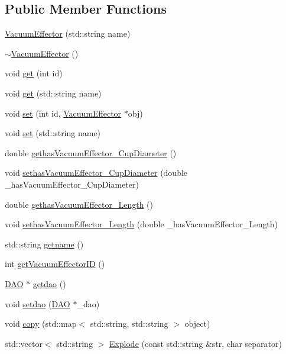 \subsection*{Public Member Functions}
\begin{DoxyCompactItemize}
\item 
\hyperlink{class_vacuum_effector_a624ed5711e9dc11a4bcdc0f6c6fd3879}{VacuumEffector} (std::string name)
\item 
\hyperlink{class_vacuum_effector_a26dc7aee2d9b3a9a7c19b5e06ac8d8f4}{$\sim$VacuumEffector} ()
\item 
void \hyperlink{class_vacuum_effector_ad61efa5e78bbcd8295b09c78488f013e}{get} (int id)
\item 
void \hyperlink{class_vacuum_effector_a7424e643d7c5440e7f988c2321b78c20}{get} (std::string name)
\item 
void \hyperlink{class_vacuum_effector_ae3c710ab5c7f24ef14b766205f3e43d8}{set} (int id, \hyperlink{class_vacuum_effector}{VacuumEffector} $\ast$obj)
\item 
void \hyperlink{class_vacuum_effector_aec767abec4cef2161bcb7e2ab7438bd2}{set} (std::string name)
\item 
double \hyperlink{class_vacuum_effector_a4c903eca9f47bb484b5059db9a9afebb}{gethasVacuumEffector\_\-CupDiameter} ()
\item 
void \hyperlink{class_vacuum_effector_a745ed7e7d447512fab5153513511d8cd}{sethasVacuumEffector\_\-CupDiameter} (double \_\-hasVacuumEffector\_\-CupDiameter)
\item 
double \hyperlink{class_vacuum_effector_ae4473fa9339b87b255972ebdba18b32e}{gethasVacuumEffector\_\-Length} ()
\item 
void \hyperlink{class_vacuum_effector_a27449af1c800a9719aecc32a17abb9a7}{sethasVacuumEffector\_\-Length} (double \_\-hasVacuumEffector\_\-Length)
\item 
std::string \hyperlink{class_vacuum_effector_a471a9f8cfa7431bda4f60b1c1c81aba2}{getname} ()
\item 
int \hyperlink{class_vacuum_effector_ae15296196f98577af7859b53792b97e0}{getVacuumEffectorID} ()
\item 
\hyperlink{class_d_a_o}{DAO} $\ast$ \hyperlink{class_vacuum_effector_ae877acc2e7d9a57e10991b5b3b9478de}{getdao} ()
\item 
void \hyperlink{class_vacuum_effector_ab6eeb1bb08951668f09b4ba48f75cbfc}{setdao} (\hyperlink{class_d_a_o}{DAO} $\ast$\_\-dao)
\item 
void \hyperlink{class_vacuum_effector_ac180edaaca8f4bd76cb28f21f0846e3b}{copy} (std::map$<$ std::string, std::string $>$ object)
\item 
std::vector$<$ std::string $>$ \hyperlink{class_vacuum_effector_adc7ad7b080152922047eba5b51834c05}{Explode} (const std::string \&str, char separator)
\end{DoxyCompactItemize}


